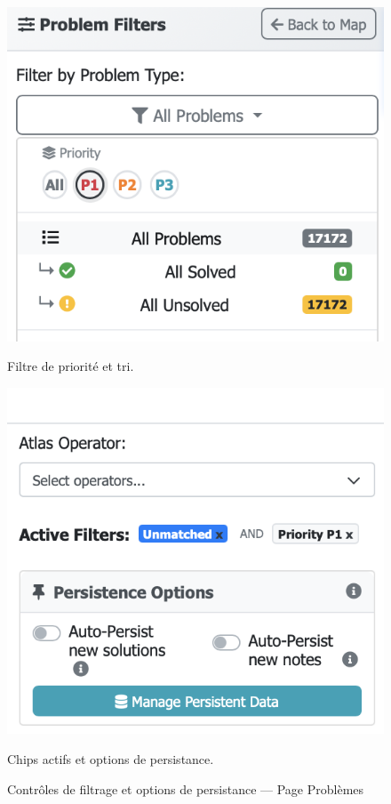 \begin{figure}[h]
  \centering
  \begin{minipage}[b]{0.48\textwidth}
    \centering
    \includegraphics[width=\textwidth]{../figures/chap9/problems priority filter.png}
    \caption*{Filtre de priorité et tri.}
  \end{minipage}\hfill
  \begin{minipage}[b]{0.48\textwidth}
    \centering
    \includegraphics[width=\textwidth]{../figures/chap9/problems fiterchips and persistence options toggles.png}
    \caption*{Chips actifs et options de persistance.}
  \end{minipage}
  \caption{Contrôles de filtrage et options de persistance — Page Problèmes}
\end{figure}


